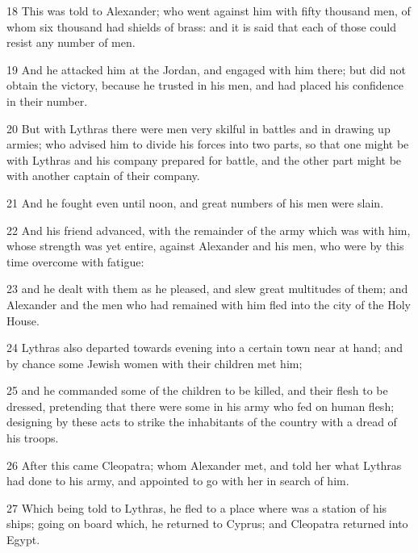 \par 18 This was told to Alexander; who went against him with fifty thousand men, of whom six thousand had shields of brass: and it is said that each of those could resist any number of men. 

\par 19 And he attacked him at the Jordan, and engaged with him there; but did not obtain the victory, because he trusted in his men, and had placed his confidence in their number. 

\par 20 But with Lythras there were men very skilful in battles and in drawing up armies; who advised him to divide his forces into two parts, so that one might be with Lythras and his company prepared for battle, and the other part might be with another captain of their company. 

\par 21 And he fought even until noon, and great numbers of his men were slain. 

\par 22 And his friend advanced, with the remainder of the army which was with him, whose strength was yet entire, against Alexander and his men, who were by this time overcome with fatigue: 

\par 23 and he dealt with them as he pleased, and slew great multitudes of them; and Alexander and the men who had remained with him fled into the city of the Holy House. 

\par 24 Lythras also departed towards evening into a certain town near at hand; and by chance some Jewish women with their children met him;

\par 25 and he commanded some of the children to be killed, and their flesh to be dressed, pretending that there were some in his army who fed on human flesh; designing by these acts to strike the inhabitants of the country with a dread of his troops. 

\par 26 After this came Cleopatra; whom Alexander met, and told her what Lythras had done to his army, and appointed to go with her in search of him. 

\par 27 Which being told to Lythras, he fled to a place where was a station of his ships; going on board which, he returned to Cyprus; and Cleopatra returned into Egypt.

